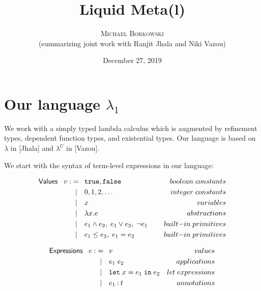 \documentclass[11pt]{article}
\newcommand{\col}{\mathbin{:}}       %
\begin{document}
\title{Liquid Meta(l)}
\author{\textsc{Michael Borkowski} \\ (summarizing joint work with {\sc Ranjit Jhala} and {\sc Niki Vazou})}
\date{December 27, 2019}

\maketitle
\thispagestyle{empty}

\section{Our language $\lambda_1$}

We work with a simply typed lambda calculus which is augmented by refinement types, dependent function types, and existential types. Our language is based on $\lambda$ in [Jhala] and $\lambda^U$ in [Vazou].

We start with the syntax of term-level expressions in our language:

\begin{align*}
{\sf Values} \;\;\; v :&=\;\: {\tt true}, {\tt false}
                         {\kern 5em}& boolean\; constants\\
                   &\;\;|\quad 0, 1, 2, \ldots 
                         & integer \; constants\\
                   &\;\;|\quad x & variables\\
                   &\;\;|\quad \lambda x . e
                         & abstractions \\
                   &\;\;|\quad e_1 \wedge e_2,\; e_1 \vee e_2,
                         \;\neg e_1 
                         & built{\rm -}in\; primitives \\
                   &\;\;|\quad e_1 \leq e_2,\; e_1 = e_2
                         & built{\rm -}in\; primitives
\end{align*}

\begin{align*}
{\sf Expressions} \;\;\; e :&=\;\: v {\kern 5 em}& values \\
	                &\;\;|\quad e_1\; e_2 & applications \\
	                &\;\;|\quad {\tt let}\; x = e_1
	                      \; {\tt in} \; e_2 & let\; expressions\\
	                &\;\;|\quad e_1 \col t & annotations \\
\end{align*}
\end{document}

